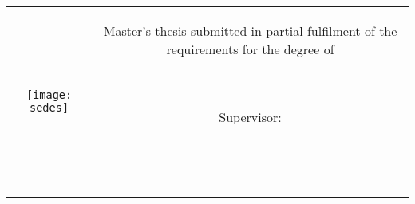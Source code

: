 \begin{titlepage}
\null\vfill
\begin{center}
\large
\sffamily

\vspace{2cm}
{\Large\spacedlowsmallcaps{\myName}} \\
\bigskip


{\huge\spacedlowsmallcaps{\myTitle} \\
}

\bigskip

{\Large\spacedlowsmallcaps{\mySubTitle}} \\

\bigskip

    
\vspace{7cm}

\begin{tabular} {cc}
\parbox{0.3\textwidth}{\texttt{[image: sedes]}}
&
\parbox{0.7\textwidth}{\normalsize{Master's thesis submitted in 
	partial fulfilment of the requirements for the degree 
		of}\\ \\ {\Large\spacedlowsmallcaps{\myDegree}}\\ 

					{\normalsize
					Supervisor: \myProf \\
					\myUni \\
					\myFac \\
					\myDepartment \\
					}}
\end{tabular}
\vfill
{}
\end{center}
\end{titlepage}



